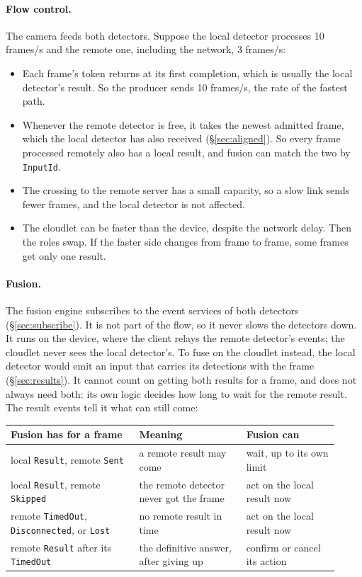 \documentclass[11pt]{article}
\newcommand{\code}[1]{\texttt{#1}}
\begin{document}
\paragraph{Flow control.} The camera feeds both detectors. Suppose the local
detector processes 10 frames/s and the remote one, including the network,
3 frames/s:
\begin{itemize}[nosep]
  \item Each frame's token returns at its first completion, which is usually
        the local detector's result. So the producer sends 10 frames/s, the
        rate of the fastest path.
  \item Whenever the remote detector is free, it takes the newest admitted
        frame, which the local detector has also received
        (\S\ref{sec:aligned}). So every frame processed remotely also has a
        local result, and fusion can match the two by \code{InputId}.
  \item The crossing to the remote server has a small capacity, so a slow
        link sends fewer frames, and the local detector is not affected.
  \item The cloudlet can be faster than the device, despite the network
        delay. Then the roles swap. If the faster side changes from frame to
        frame, some frames get only one result.
\end{itemize}

\paragraph{Fusion.} The fusion engine subscribes to the event services of both
detectors (\S\ref{sec:subscribe}). It is not part of the flow, so it never
slows the detectors down. It runs on the device, where the client relays the
remote detector's events; the cloudlet never sees the local detector's. To
fuse on the cloudlet instead, the local detector would emit an input that
carries its detections with the frame (\S\ref{sec:results}). It cannot count on getting both results for a frame, and does not
always need both: its own logic decides how long to wait for the remote
result. The result events tell it what can still come:

\begin{center}
\small
\begin{tabular}{@{}p{0.36\linewidth}p{0.3\linewidth}p{0.26\linewidth}@{}}
\toprule
Fusion has for a frame & Meaning & Fusion can \\
\midrule
local \code{Result}, remote \code{Sent}
  & a remote result may come & wait, up to its own limit \\
local \code{Result}, remote \code{Skipped}
  & the remote detector never got the frame & act on the local result now \\
remote \code{TimedOut}, \code{Disconnected}, or \code{Lost}
  & no remote result in time & act on the local result now \\
remote \code{Result} after its \code{TimedOut}
  & the definitive answer, after giving up & confirm or cancel its action \\
\bottomrule
\end{tabular}
\end{center}
\end{document}
